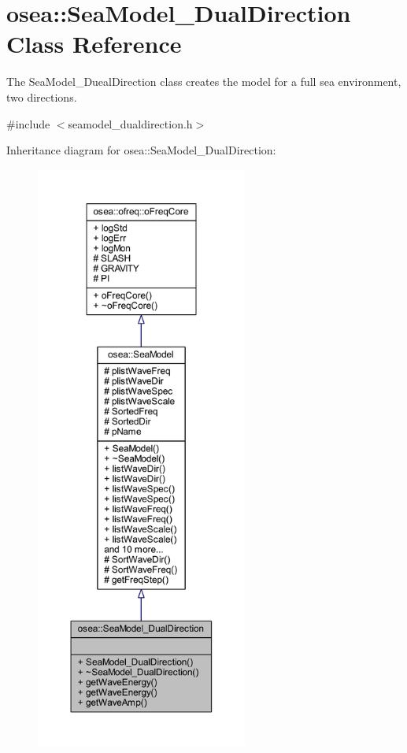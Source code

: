 \hypertarget{classosea_1_1_sea_model___dual_direction}{\section{osea\-:\-:Sea\-Model\-\_\-\-Dual\-Direction Class Reference}
\label{classosea_1_1_sea_model___dual_direction}
}


The Sea\-Model\-\_\-\-Dueal\-Direction class creates the model for a full sea environment, two directions.  




{\ttfamily \#include $<$seamodel\-\_\-dualdirection.\-h$>$}



Inheritance diagram for osea\-:\-:Sea\-Model\-\_\-\-Dual\-Direction\-:
\nopagebreak
\begin{figure}[H]
\begin{center}
\leavevmode
\includegraphics[height=550pt]{classosea_1_1_sea_model___dual_direction__inherit__graph}
\end{center}
\end{figure}
